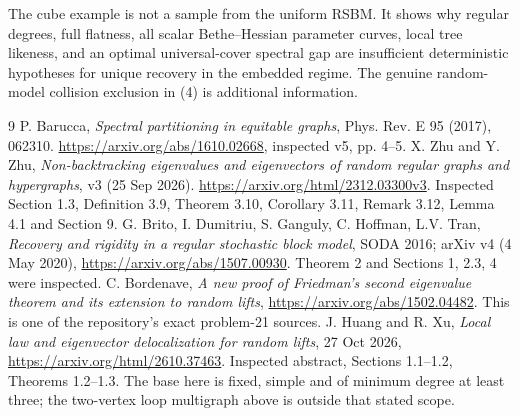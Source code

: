 \documentclass[11pt]{article}
\begin{document}
The cube example is not a sample from the uniform RSBM. It shows why
regular degrees, full flatness, all scalar Bethe--Hessian parameter
curves, local tree likeness, and an optimal universal-cover spectral gap
are insufficient deterministic hypotheses for unique recovery in the
embedded regime. The genuine random-model collision exclusion in (4)
is additional information.

\begin{thebibliography}{9}
 P. Barucca, \emph{Spectral partitioning in equitable graphs},
Phys. Rev. E 95 (2017), 062310.
\url{https://arxiv.org/abs/1610.02668}, inspected v5, pp. 4--5.
 X. Zhu and Y. Zhu, \emph{Non-backtracking eigenvalues and
eigenvectors of random regular graphs and hypergraphs}, v3 (25 Sep 2026).
\url{https://arxiv.org/html/2312.03300v3}.
Inspected Section 1.3, Definition 3.9, Theorem 3.10, Corollary 3.11,
Remark 3.12, Lemma 4.1 and Section 9.
 G. Brito, I. Dumitriu, S. Ganguly, C. Hoffman, L.V. Tran,
\emph{Recovery and rigidity in a regular stochastic block model},
SODA 2016; arXiv v4 (4 May 2020),
\url{https://arxiv.org/abs/1507.00930}.
Theorem 2 and Sections 1, 2.3, 4 were inspected.
 C. Bordenave, \emph{A new proof of Friedman's second
eigenvalue theorem and its extension to random lifts},
\url{https://arxiv.org/abs/1502.04482}.
This is one of the repository's exact problem-21 sources.
 J. Huang and R. Xu, \emph{Local law and eigenvector
delocalization for random lifts}, 27 Oct 2026,
\url{https://arxiv.org/html/2610.37463}.
Inspected abstract, Sections 1.1--1.2, Theorems 1.2--1.3.
The base here is fixed, simple and of minimum degree at least three;
the two-vertex loop multigraph above is outside that stated scope.
\end{thebibliography}
\end{document}
